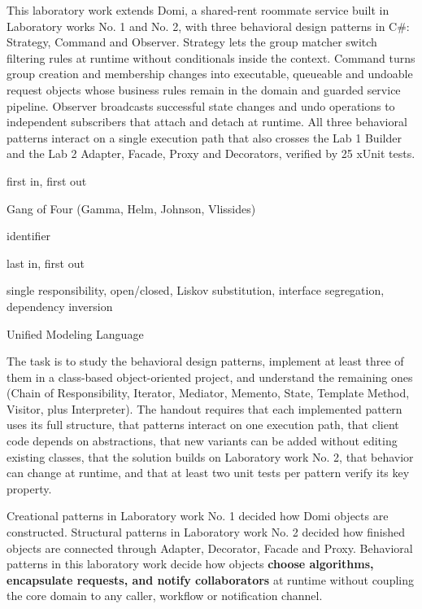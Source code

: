 \documentclass{utmreport}
\begin{document}
\makeutmreporttitlepage
\tableofcontents
\begin{utmabstract}[Abstract]
This laboratory work extends Domi, a shared-rent roommate service built in Laboratory works No. 1 and No. 2, with three behavioral design patterns in C\#: Strategy, Command and Observer. Strategy lets the group matcher switch filtering rules at runtime without conditionals inside the context. Command turns group creation and membership changes into executable, queueable and undoable request objects whose business rules remain in the domain and guarded service pipeline. Observer broadcasts successful state changes and undo operations to independent subscribers that attach and detach at runtime. All three behavioral patterns interact on a single execution path that also crosses the Lab 1 Builder and the Lab 2 Adapter, Facade, Proxy and Decorators, verified by 25 xUnit tests.

\end{utmabstract}

\begin{utmabbreviations}
\item[FIFO] first in, first out
\item[GoF] Gang of Four (Gamma, Helm, Johnson, Vlissides)
\item[ID] identifier
\item[LIFO] last in, first out
\item[SOLID] single responsibility, open/closed, Liskov substitution, interface segregation, dependency inversion
\item[UML] Unified Modeling Language
\end{utmabbreviations}

\utmintroduction
The task is to study the behavioral design patterns, implement at least three of them in a class-based object-oriented project, and understand the remaining ones (Chain of Responsibility, Iterator, Mediator, Memento, State, Template Method, Visitor, plus Interpreter). The handout requires that each implemented pattern uses its full structure, that patterns interact on one execution path, that client code depends on abstractions, that new variants can be added without editing existing classes, that the solution builds on Laboratory work No. 2, that behavior can change at runtime, and that at least two unit tests per pattern verify its key property.

Creational patterns in Laboratory work No. 1 decided how Domi objects are constructed. Structural patterns in Laboratory work No. 2 decided how finished objects are connected through Adapter, Decorator, Facade and Proxy. Behavioral patterns in this laboratory work decide how objects \textbf{choose algorithms, encapsulate requests, and notify collaborators} at runtime without coupling the core domain to any caller, workflow or notification channel.
\end{document}

